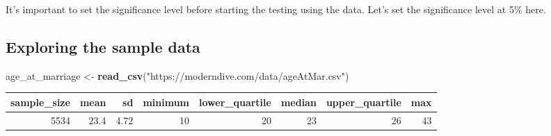\documentclass[12pt,]{krantz}
\makeatletter
\newenvironment{Shaded}{\begin{snugshade}}{\end{snugshade}}
\newcommand{\KeywordTok}[1]{\textcolor[rgb]{0.27,0.27,0.27}{\textbf{#1}}}
\newcommand{\DataTypeTok}[1]{\textcolor[rgb]{0.27,0.27,0.27}{#1}}
\newcommand{\DecValTok}[1]{\textcolor[rgb]{0.06,0.06,0.06}{#1}}
\newcommand{\FloatTok}[1]{\textcolor[rgb]{0.06,0.06,0.06}{#1}}
\newcommand{\StringTok}[1]{\textcolor[rgb]{0.5,0.5,0.5}{#1}}
\newcommand{\OperatorTok}[1]{\textcolor[rgb]{0.43,0.43,0.43}{\textbf{#1}}}
\newcommand{\NormalTok}[1]{#1}
\newenvironment{kframe}{%
\medskip{}
\setlength{\fboxsep}{.8em}
 \def\at@end@of@kframe{}%
 \ifinner\ifhmode%
  \def\at@end@of@kframe{\end{minipage}}%
  \begin{minipage}{\columnwidth}%
 \fi\fi%
 \def\FrameCommand##1{\hskip\@totalleftmargin \hskip-\fboxsep
 \colorbox{shadecolor}{##1}\hskip-\fboxsep
     \hskip-\linewidth \hskip-\@totalleftmargin \hskip\columnwidth}%
 \MakeFramed {\advance\hsize-\width
   \@totalleftmargin\z@ \linewidth\hsize
   \@setminipage}}%
 {\par\unskip\endMakeFramed%
 \at@end@of@kframe}
\renewenvironment{Shaded}{\begin{kframe}}{\end{kframe}}
\theoremstyle{definition}
\theoremstyle{definition}
\theoremstyle{definition}
\theoremstyle{remark}
\makeatother
\begin{document}
It's important to set the significance level before starting the testing
using the data. Let's set the significance level at 5\% here.

\subsection{Exploring the sample data}\label{exploring-the-sample-data}

\begin{Shaded}
\begin{Highlighting}[]
\NormalTok{age_at_marriage <-}\StringTok{ }\KeywordTok{read_csv}\NormalTok{(}\StringTok{"https://moderndive.com/data/ageAtMar.csv"}\NormalTok{)}
\end{Highlighting}
\end{Shaded}

\begin{Shaded}
\end{Shaded}

\begin{table}[H]
\centering\begingroup\fontsize{10}{12}\selectfont

\begin{tabular}{r|r|r|r|r|r|r|r}
\hline
sample\_size & mean & sd & minimum & lower\_quartile & median & upper\_quartile & max\\
\hline
5534 & 23.4 & 4.72 & 10 & 20 & 23 & 26 & 43\\
\hline
\end{tabular}\endgroup{}
\end{table}
\end{document}
